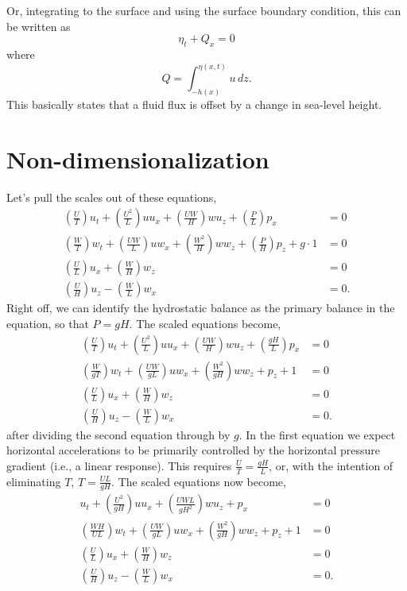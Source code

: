 \documentclass[11pt]{article}
\begin{document}
Or, integrating to the surface and using the surface boundary condition, this can be written as
\begin{equation}
\eta_t + Q_x  = 0
\end{equation}
where
\begin{equation}
Q = \int_{-h(x)}^{\eta(x,t)} u \, dz.
\end{equation}
This basically states that a fluid flux is offset by a change in sea-level height.

\section{Non-dimensionalization}

Let's pull the scales out of these equations,
\begin{align}
\left( \frac{U}{T} \right) u_t + \left( \frac{U^2}{L} \right)  u u_x + \left( \frac{UW}{H} \right)  w u_z + \left( \frac{P}{L} \right)  p_x &=0 \\
\left( \frac{W}{T} \right)  w_t+ \left( \frac{UW}{L} \right)  u w_x + \left( \frac{W^2}{H} \right)  w w_z + \left( \frac{P}{H} \right)  p_z + g \cdot 1 &=0 \\
\left( \frac{U}{L} \right) u_x + \left( \frac{W}{H} \right)  w_z &= 0 \\
\left( \frac{U}{H} \right) u_z - \left( \frac{W}{L} \right)  w_x &= 0.
\end{align}
Right off, we can identify the hydrostatic balance as the primary balance in the equation, so that $P=gH$. The scaled equations become,
\begin{align}
\left( \frac{U}{T} \right) u_t + \left( \frac{U^2}{L} \right)  u u_x + \left( \frac{UW}{H} \right)  w u_z + \left( \frac{gH}{L} \right)  p_x &=0 \\
\left( \frac{W}{gT} \right)  w_t+ \left( \frac{UW}{gL} \right)  u w_x + \left( \frac{W^2}{gH} \right)  w w_z + p_z + 1 &=0 \\
\left( \frac{U}{L} \right) u_x + \left( \frac{W}{H} \right)  w_z &= 0 \\
\left( \frac{U}{H} \right) u_z - \left( \frac{W}{L} \right)  w_x &= 0.
\end{align}
after dividing the second equation through by $g$. In the first equation we expect horizontal accelerations to be primarily controlled by the horizontal pressure gradient (i.e., a linear response). This requires $\frac{U}{T}=\frac{gH}{L}$, or, with the intention of eliminating $T$, $T = \frac{U L}{gH}$. The scaled equations now become,
\begin{align}
u_t + \left( \frac{U^2}{gH} \right)  u u_x + \left( \frac{UW L}{gH^2} \right)  w u_z + p_x &=0 \\
\left( \frac{WH}{UL} \right)  w_t+ \left( \frac{UW}{gL} \right)  u w_x + \left( \frac{W^2}{gH} \right)  w w_z + p_z + 1 &=0 \\
\left( \frac{U}{L} \right) u_x + \left( \frac{W}{H} \right)  w_z &= 0 \\
\left( \frac{U}{H} \right) u_z - \left( \frac{W}{L} \right)  w_x &= 0.
\end{align}
\end{document}
